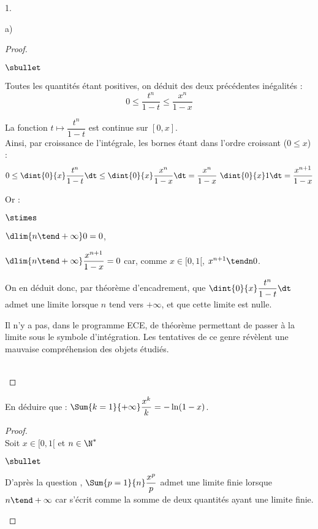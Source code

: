 \documentclass[11pt]{article}%
\begin{document}
\begin{noliste}{1.}
\begin{noliste}{a)}
\begin{proof}
\begin{noliste}{$\sbullet$}
      \item Toutes les quantités étant positives, on déduit des deux
        précédentes inégalités :
        \[
        0 \leq \dfrac{t^n}{1-t} \leq \dfrac{x^n}{1-x}
        \]

      \item La fonction $t \mapsto \dfrac{t^n}{1-t}$ est continue sur
        $[0, x]$.\\
        Ainsi, par croissance de l'intégrale, les bornes étant dans
        l'ordre croissant ($0 \leq x$) :
        \[
        0 \leq \dint{0}{x} \dfrac{t^n}{1-t} \dt \leq \dint{0}{x}
        \dfrac{x^n}{1-x} \dt = \dfrac{x^n}{1-x} \ \dint{0}{x} 1 \dt =
        \dfrac{x^{n+1}}{1-x}
        \]

      \item Or :
        \begin{noliste}{$\stimes$}
        \item $\dlim{n \tend +\infty} 0 = 0$,
        \item $\dlim{n \tend +\infty} \dfrac{x^{n+1}}{1-x} = 0$ car,
          comme $x \in [0, 1[$, $x^{n+1} \tendn 0$.
        \end{noliste}
        On en déduit donc, par théorème d'encadrement, que
        $\dint{0}{x} \dfrac{t^n}{1-t} \dt$ admet une limite lorsque
        $n$ tend vers $+\infty$, et que cette limite est nulle.
      \end{noliste}
      \conc{$\forall x \in [0,1[$, $\dlim{n \tend +\infty} \dint{0}{x}
        \dfrac{t^n}{1-t} \dt = 0$}%
      \begin{remark}%
        Il n'y a pas, dans le programme ECE, de théorème permettant de
        passer à la limite sous le symbole d'intégration. Les
        tentatives de ce genre révèlent une mauvaise compréhension des
        objets étudiés.
      \end{remark}~\\[-1.4cm]
    \end{proof}

  \item En déduire que : $\Sum{k = 1}{+ \infty}\dfrac{x^k}{k} =
    -\ln(1-x)$.

    \begin{proof}~\\
      Soit $x \in [0, 1[$ et $n \in \N^*$
      \begin{noliste}{$\sbullet$}
      \item D'après la question , $\Sum{p = 1}{n}
        \dfrac{x^{p}}{p}$ admet une limite finie lorsque $n \tend
        +\infty$ car s'écrit comme la somme de deux quantités ayant
        une limite finie.


\end{noliste}
\end{proof}
\end{noliste}
\end{noliste}
\end{document}
